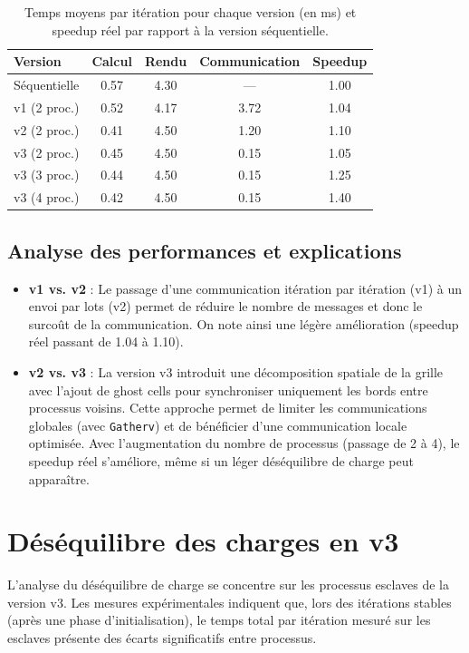 \documentclass[a4paper,13pt]{book}
\begin{document}
\begin{table}[ht]
  \centering
  \caption{Temps moyens par itération pour chaque version (en ms) et speedup réel par rapport à la version séquentielle.}
  \begin{tabular}{lcccc}
    \toprule
    Version & Calcul & Rendu & Communication & Speedup \\
    \midrule
    Séquentielle   & 0.57 & 4.30 & ---  & 1.00 \\
    v1 (2 proc.)   & 0.52 & 4.17 & 3.72 & 1.04 \\
    v2 (2 proc.)   & 0.41 & 4.50 & 1.20 & 1.10 \\
    v3 (2 proc.)   & 0.45 & 4.50 & 0.15 & 1.05 \\
    v3 (3 proc.)   & 0.44 & 4.50 & 0.15 & 1.25 \\
    v3 (4 proc.)   & 0.42 & 4.50 & 0.15 & 1.40 \\
    \bottomrule
  \end{tabular}
  \label{tab:temps}
\end{table}

\subsection{Analyse des performances et explications}

\begin{itemize}
  \item \textbf{v1 vs. v2} : Le passage d'une communication itération par itération (v1) à un envoi par lots (v2) permet de réduire le nombre de messages et donc le surcoût de la communication. On note ainsi une légère amélioration (speedup réel passant de 1.04 à 1.10).
  \item \textbf{v2 vs. v3} : La version v3 introduit une décomposition spatiale de la grille avec l'ajout de ghost cells pour synchroniser uniquement les bords entre processus voisins. Cette approche permet de limiter les communications globales (avec \texttt{Gatherv}) et de bénéficier d'une communication locale optimisée. Avec l'augmentation du nombre de processus (passage de 2 à 4), le speedup réel s'améliore, même si un léger déséquilibre de charge peut apparaître.
\end{itemize}

\section{Déséquilibre des charges en v3}

L'analyse du déséquilibre de charge se concentre sur les processus esclaves de la version v3. Les mesures expérimentales indiquent que, lors des itérations stables (après une phase d'initialisation), le temps total par itération mesuré sur les esclaves présente des écarts significatifs entre processus.
\end{document}
